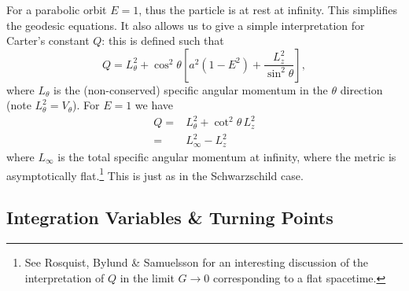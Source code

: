 \documentclass[a4paper, 11pt, titlepage, twoside]{report}
\begin{document}
{For a parabolic orbit $E = 1$, thus the particle is at rest at infinity. This simplifies the geodesic equations. It also allows us to give a simple interpretation for Carter's constant $Q$: this is defined such that
\begin{equation}
Q = L_\theta^2 + \cos^2\theta\left[a^2\left(1 - E^2\right) + \frac{L_z^2}{\sin^2\theta}\right],
\end{equation}
where $L_\theta$ is the (non-conserved) specific angular momentum in the $\theta$ direction (note $L_\theta^2 = V_\theta$). For $E = 1$ we have
\begin{align}
Q = {} & L_\theta^2 + \cot^2\theta\, L_z^2 \nonumber \\
 = {} & L_\infty^2 - L_z^2
\end{align}
where $L_\infty$ is the total specific angular momentum at infinity, where the metric is asymptotically flat\cite{DeFelice1980}.\footnote{See Rosquist, Bylund \& Samuelsson\cite{Rosquist2009} for an interesting discussion of the interpretation of $Q$ in the limit $G \rightarrow 0$ corresponding to a flat spacetime.} This is just as in the Schwarzschild case.

\subsection{Integration Variables \& Turning Points}

}
\end{document}
